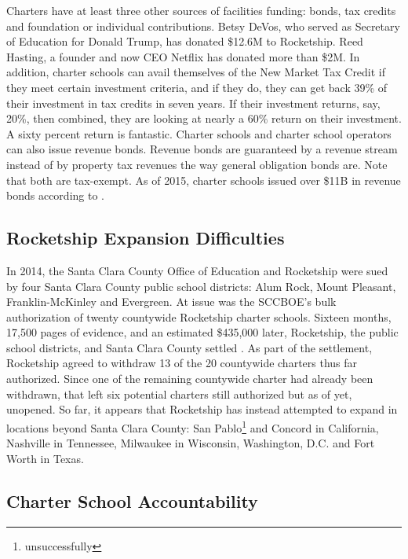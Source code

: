Charters have at least three other sources of facilities funding: bonds, tax credits and foundation or individual contributions. Betsy DeVos, who served as Secretary of Education for Donald Trump, has donated \$12.6M to Rocketship. Reed Hasting, a founder and now CEO Netflix has donated more than \$2M. In addition, charter schools can avail themselves of the New Market Tax Credit if they meet certain investment criteria, and if they do, they can get back 39\% of their investment  in tax credits in seven years. If their investment returns, say, 20\%, then combined, they are looking at nearly a 60\% return on their investment. A sixty percent return is fantastic. Charter schools and charter school operators can also issue revenue bonds. Revenue bonds are guaranteed by a revenue stream instead of by property tax revenues the way general obligation bonds are. Note that both are tax-exempt. As of 2015, charter schools issued over \$11B in revenue bonds according to \textcite{Clark-Herrera.etal2019}.

\subsection{Rocketship Expansion Difficulties}\label{sec:rocketship-expansion-difficulties}\indent

In 2014, the Santa Clara County Office of Education and Rocketship were sued by four Santa Clara County public school districts: Alum Rock, Mount Pleasant, Franklin-McKinley and Evergreen. At issue was the SCCBOE's bulk authorization of twenty countywide Rocketship charter schools. Sixteen months, 17,500 pages of evidence, and an estimated \$435,000 later, Rocketship, the public school districts, and Santa Clara County settled \parencite{Noguchi2015}. As part of the settlement, Rocketship agreed to withdraw 13 of the 20 countywide charters thus far authorized. Since one of the remaining countywide charter had already been withdrawn, that left six potential charters still authorized but as of yet, unopened. So far, it appears that Rocketship has instead attempted to expand in locations beyond Santa Clara County: San Pablo\footnote{unsuccessfully} and Concord in California, Nashville in Tennessee, Milwaukee in Wisconsin, Washington, D.C. and Fort Worth in Texas.

\subsection{Charter School Accountability}\label{sec:charter-accountability}\indent

